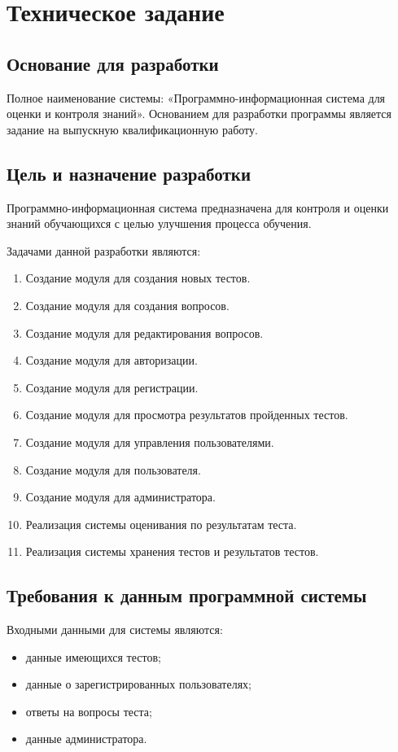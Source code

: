\section{Техническое задание}
\subsection{Основание для разработки}

Полное наименование системы: «Программно-информационная система для оценки и контроля знаний».
Основанием для разработки программы является задание на выпускную квалификационную работу.

\subsection{Цель и назначение разработки}

Программно-информационная система предназначена для контроля и оценки знаний обучающихся с целью улучшения процесса обучения.

Задачами данной разработки являются:
\begin{enumerate}
\item Создание модуля для создания новых тестов.
\item Создание модуля для создания вопросов.
\item Создание модуля для редактирования вопросов.
\item Создание модуля для авторизации.
\item Создание модуля для регистрации.
\item Создание модуля для просмотра результатов пройденных тестов.
\item Создание модуля для управления пользователями.
\item Создание модуля для пользователя.
\item Создание модуля для администратора.
\item Реализация системы оценивания по результатам теста.
\item Реализация системы хранения тестов и результатов тестов.
\end{enumerate}

\subsection{Требования к данным программной системы}

Входными данными для системы являются:
\begin{itemize}
    \item данные имеющихся тестов;
    \item данные о зарегистрированных пользователях;
    \item ответы на вопросы теста;
    \item данные администратора.
\end{itemize}

